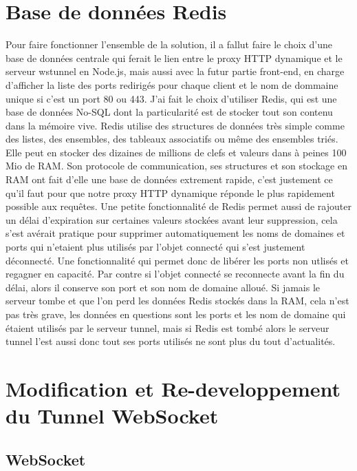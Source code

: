 \section{Base de données Redis}

Pour faire fonctionner l'ensemble de la solution, il a fallut faire le choix d'une base de données centrale qui ferait le lien entre le proxy HTTP dynamique et le serveur wstunnel en Node.js, mais aussi avec la futur partie front-end, en charge d'afficher la liste des ports redirigés pour chaque client et le nom de dommaine unique si c'est un port 80 ou 443. J'ai fait le choix d'utiliser Redis, qui est une base de données No-SQL dont la particularité est de stocker tout son contenu dans la mémoire vive. Redis utilise des structures de données très simple comme des listes, des ensembles, des tableaux associatifs ou même des ensembles triés. Elle peut en stocker des dizaines de millions de clefs et valeurs dans à peines 100 Mio de RAM. Son protocole de communication, ses structures et son stockage en RAM ont fait d'elle une base de données extrement rapide, c'est justement ce qu'il faut pour que notre proxy HTTP dynamique réponde le plus rapidement possible aux requêtes. Une petite fonctionnalité de Redis permet aussi de rajouter un délai d'expiration sur certaines valeurs stockées avant leur suppression, cela s'est avérait pratique pour supprimer automatiquement les noms de domaines et ports qui n'etaient plus utilisés par l'objet connecté qui s'est justement déconnecté. Une fonctionnalité qui permet donc de libérer les ports non utlisés et regagner en capacité. Par contre si l'objet connecté se reconnecte avant la fin du délai, alors il conserve son port et son nom de domaine alloué. Si jamais le serveur tombe et que l'on perd les données Redis stockés dans la RAM, cela n'est pas très grave, les données en questions sont les ports et les nom de domaine qui étaient utilisés par le serveur tunnel, mais si Redis est tombé alors le serveur tunnel l'est aussi donc tout ses ports utilisés ne sont plus du tout d'actualités.

\section{Modification et Re-developpement du Tunnel WebSocket}

\subsection{WebSocket}

